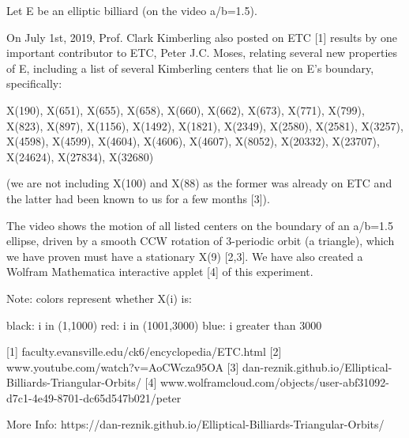 Let E be an elliptic billiard (on the video a/b=1.5).

On July 1st, 2019, Prof. Clark Kimberling also posted on ETC [1] results by one important contributor to ETC, Peter J.C. Moses, relating several new properties of E, including a list of several Kimberling centers that lie on E's boundary, specifically: 

X(190), X(651), X(655), X(658), X(660), X(662), X(673),
X(771), X(799), X(823), X(897), X(1156), X(1492),
X(1821), X(2349), X(2580), X(2581), X(3257), X(4598),
X(4599), X(4604), X(4606), X(4607), X(8052), X(20332),
X(23707), X(24624), X(27834), X(32680)

(we are not including X(100) and X(88) as the former was already on ETC and the latter had been known to us for a few months [3]).

The video shows the motion of all listed centers on the boundary of an a/b=1.5 ellipse, driven by a smooth CCW rotation of 3-periodic orbit (a triangle), which we have proven must have a stationary X(9) [2,3]. We have also created a Wolfram Mathematica interactive applet [4] of this experiment.

Note: colors represent whether X(i) is:

black: i in (1,1000)
red: i in (1001,3000)
blue: i greater than 3000

[1] faculty.evansville.edu/ck6/encyclopedia/ETC.html
[2] www.youtube.com/watch?v=AoCWcza95OA
[3] dan-reznik.github.io/Elliptical-Billiards-Triangular-Orbits/
[4] www.wolframcloud.com/objects/user-abf31092-d7c1-4e49-8701-dc65d547b021/peter%

More Info: https://dan-reznik.github.io/Elliptical-Billiards-Triangular-Orbits/